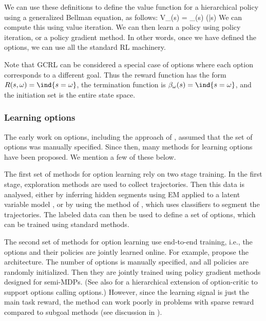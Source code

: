 We can use these
definitions to define the value function for a hierarchical policy
using a generalized Bellman equation, as follows:
\be
V_{\pi}(s) = \sum_{\omega  \in \Omega(s)}
\pi(\omega|s)
\ee
We can compute this using value iteration.
We can  then learn a policy using
policy iteration, or a policy gradient method.
In other words, once we have defined the options,
we can use all the standard RL machinery.

Note that GCRL can be considered a special case of options
where each option corresponds to a different goal.
Thus the reward function has the form
$R(s,\omega)=\ind{s=\omega}$,
the termination function is
$\beta_{\omega}(s)=\ind{s=\omega}$,
and
the initiation set is the entire state space.

\subsubsection{Learning options}

The early work on options,
including the  approach of
\citep{Dietterich2000hrl},
assumed that the set of options was manually specified.
Since then, many methods for learning options have been proposed.
We mention a few of these below.


The first set of methods for option learning
rely on two stage training.
In the first stage, exploration methods
are used to collect trajectories.
Then this data is analysed, 
either by inferring hidden segments
using EM applied to a latent variable model
\citep{Daniel2016},
or  by using
the  method
of \citep{Konidaris2009},
which uses
classifiers to segment the trajectories.
The labeled data can then be used to define
a set of options, which can be trained using standard methods.



The second set of methods for option learning
use end-to-end training,
i.e., the options and their policies are jointly learned online.
For example,
\citep{Bacon2017} propose the   architecture.
The number of options is manually specified,
and all policies are randomly initialized.
Then they are jointly trained using policy gradient methods
designed for semi-MDPs.
(See also \citep{Riemer2018} for a hierarchical
extension of option-critic to support options calling options.)
However, since the learning signal is just the main task reward,
the method can work poorly
in problems with sparse reward compared to
subgoal methods
(see discussion in \citep{Vezhnevets2017,Nachum2019}).

